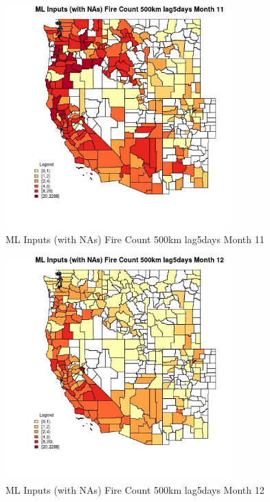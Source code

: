 \begin{figure} 
\centering  
\includegraphics[width=0.77\textwidth]{Code_Outputs/Report_ML_input_PM25_Step4_part_e_de_duplicated_aves_compiled_2019-05-20wNAs_CountyFire_Count_500km_lag5daysmedianMonth11.jpg} 
\caption{\label{fig:Report_ML_input_PM25_Step4_part_e_de_duplicated_aves_compiled_2019-05-20wNAsCountyFire_Count_500km_lag5daysmedianMonth11}ML Inputs (with NAs) Fire Count 500km lag5days Month 11} 
\end{figure} 
 

\begin{figure} 
\centering  
\includegraphics[width=0.77\textwidth]{Code_Outputs/Report_ML_input_PM25_Step4_part_e_de_duplicated_aves_compiled_2019-05-20wNAs_CountyFire_Count_500km_lag5daysmedianMonth12.jpg} 
\caption{\label{fig:Report_ML_input_PM25_Step4_part_e_de_duplicated_aves_compiled_2019-05-20wNAsCountyFire_Count_500km_lag5daysmedianMonth12}ML Inputs (with NAs) Fire Count 500km lag5days Month 12} 
\end{figure} 
 

